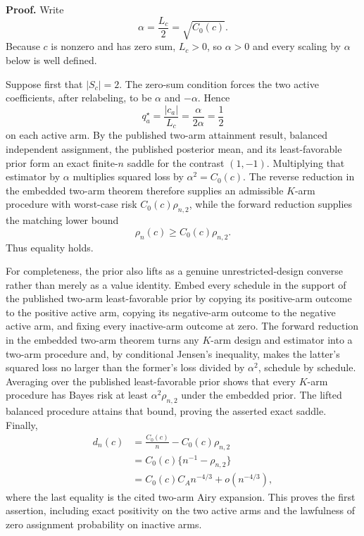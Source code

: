 \textbf{Proof.}
Write
\[
 \alpha=\frac{L_c}{2}=\sqrt{C_0(c)}.
\]
Because \(c\) is nonzero and has zero sum, \(L_c>0\), so \(\alpha>0\) and every scaling by \(\alpha\) below is well defined.

Suppose first that \(|S_c|=2\).  The zero-sum condition forces the two active coefficients, after relabeling, to be \(\alpha\) and \(-\alpha\).  Hence
\[
 q_a^\star=\frac{|c_a|}{L_c}=\frac{\alpha}{2\alpha}=\frac12
\]
on each active arm.  By the published two-arm attainment result, balanced independent assignment, the published posterior mean, and its least-favorable prior form an exact finite-\(n\) saddle for the contrast \((1,-1)\).  Multiplying that estimator by \(\alpha\) multiplies squared loss by \(\alpha^2=C_0(c)\).  The reverse reduction in the embedded two-arm theorem therefore supplies an admissible \(K\)-arm procedure with worst-case risk \(C_0(c)\rho_{n,2}\), while the forward reduction supplies the matching lower bound
\[
 \rho_n(c)\geq C_0(c)\rho_{n,2}.
\]
Thus equality holds.

For completeness, the prior also lifts as a genuine unrestricted-design converse rather than merely as a value identity.  Embed every schedule in the support of the published two-arm least-favorable prior by copying its positive-arm outcome to the positive active arm, copying its negative-arm outcome to the negative active arm, and fixing every inactive-arm outcome at zero.  The forward reduction in the embedded two-arm theorem turns any \(K\)-arm design and estimator into a two-arm procedure and, by conditional Jensen's inequality, makes the latter's squared loss no larger than the former's loss divided by \(\alpha^2\), schedule by schedule.  Averaging over the published least-favorable prior shows that every \(K\)-arm procedure has Bayes risk at least \(\alpha^2\rho_{n,2}\) under the embedded prior.  The lifted balanced procedure attains that bound, proving the asserted exact saddle.  Finally,
\[
 \begin{aligned}
 d_n(c)
 &=\frac{C_0(c)}n-C_0(c)\rho_{n,2}\\
 &=C_0(c)\{n^{-1}-\rho_{n,2}\}\\
 &=C_0(c)C_A n^{-4/3}+o(n^{-4/3}),
 \end{aligned}
\]
where the last equality is the cited two-arm Airy expansion.  This proves the first assertion, including exact positivity on the two active arms and the lawfulness of zero assignment probability on inactive arms.

